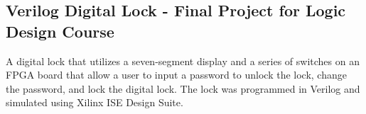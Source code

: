 \documentclass{article}
\begin{document}
\subsection{Verilog Digital Lock - Final Project for Logic Design Course}
A digital lock that utilizes a seven-segment display and a series of switches on an FPGA board that allow a user to input a password to unlock the lock, change the password, and lock the digital lock. The lock was programmed in Verilog and simulated using Xilinx ISE Design Suite.
\end{document}
